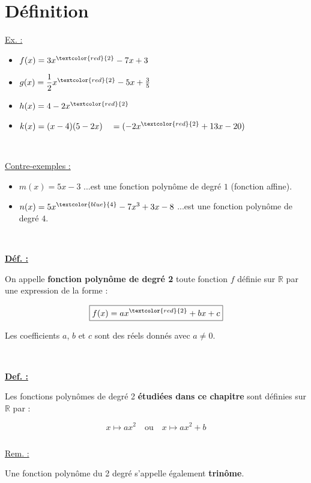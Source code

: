 

\def\Titre{Fonctions du 2\up{nd} degré}
\def\DevoirSur{}


\DoTitle{}
\section{Définition}

\ul{Ex. :}

\begin{itemize}
    \item $f(x)=3x^{\textcolor{red}{2}}-7x+3$
    \item $g(x)=\dfrac{1}{2}x^{\textcolor{red}{2}}-5x+\frac{3}{5}$
    \item $h(x)=4-2x^{\textcolor{red}{2}}$
    \item $k(x)=(x-4)(5-2x)\quad=(-2x^{\textcolor{red}{2}}+13x-20)$
\end{itemize}
\par~\par
\ul{Contre-exemples :}

\begin{itemize}
    \item $m(x)=5x-3$ ...est une fonction polynôme de degré $1$ (fonction affine).
    \item $n(x)=5x^{\textcolor{blue}{4}}-7x^{3}+3x-8$ ...est une fonction polynôme de degré $4$.
\end{itemize}
\par~\par
\ul{\textbf{Déf. :}}

On appelle \textbf{fonction polynôme de degré 2} toute fonction $f$ définie sur $\mathbb{R}$ par une expression de la forme :

$$\boxed{f(x)=ax^{\textcolor{red}{2}}+bx+c}$$

Les coefficients $a$, $b$ et $c$ sont des réels donnés avec $a \neq 0$.
\par~\par
\ul{\textbf{Def. :}}

Les fonctions polynômes de degré 2 \textbf{étudiées dans ce chapitre} sont définies sur $\mathbb{R}$ par :

$$\boxed{x \mapsto ax^{2}}\quad\text{ou}\quad\boxed{x\mapsto ax^{2}+b}$$

\par$~$\par


\ul{Rem. :}

Une fonction polynôme du 2 degré s'appelle également \textbf{trinôme}.

